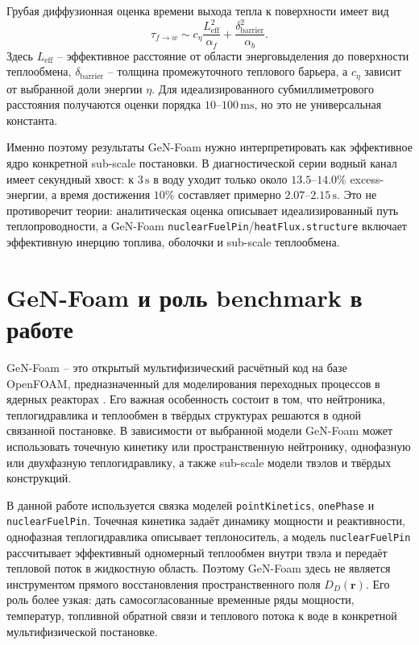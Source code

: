 \documentclass[12pt]{article}
\begin{document}
Грубая диффузионная оценка времени выхода тепла к поверхности имеет вид
\[
\tau_{f\to w}\sim
c_\eta\frac{L_{\mathrm{eff}}^2}{\alpha_f}
+
\frac{\delta_{\mathrm{barrier}}^2}{\alpha_b}.
\]
Здесь \(L_{\mathrm{eff}}\) -- эффективное расстояние от области энерговыделения до поверхности теплообмена, \(\delta_{\mathrm{barrier}}\) -- толщина промежуточного теплового барьера, а \(c_\eta\) зависит от выбранной доли энергии \(\eta\). Для идеализированного субмиллиметрового расстояния получаются оценки порядка \(10\)--\(100\,\mathrm{ms}\), но это не универсальная константа.

Именно поэтому результаты GeN-Foam нужно интерпретировать как эффективное ядро конкретной sub-scale постановки. В диагностической серии водный канал имеет секундный хвост: к \(3\,\mathrm{s}\) в воду уходит только около \(13.5\)--\(14.0\%\) excess-энергии, а время достижения \(10\%\) составляет примерно \(2.07\)--\(2.15\,\mathrm{s}\). Это не противоречит теории: аналитическая оценка описывает идеализированный путь теплопроводности, а GeN-Foam \texttt{nuclearFuelPin}/\texttt{heatFlux.structure} включает эффективную инерцию топлива, оболочки и sub-scale теплообмена.

\section{GeN-Foam и роль benchmark в работе}

GeN-Foam -- это открытый мультифизический расчётный код на базе OpenFOAM, предназначенный для моделирования переходных процессов в ядерных реакторах \cite{GeNFoam2015,foamForNuclear2026}. Его важная особенность состоит в том, что нейтроника, теплогидравлика и теплообмен в твёрдых структурах решаются в одной связанной постановке. В зависимости от выбранной модели GeN-Foam может использовать точечную кинетику или пространственную нейтронику, однофазную или двухфазную теплогидравлику, а также sub-scale модели твэлов и твёрдых конструкций.

В данной работе используется связка моделей \texttt{pointKinetics}, \texttt{onePhase} и \texttt{nuclearFuelPin}. Точечная кинетика задаёт динамику мощности и реактивности, однофазная теплогидравлика описывает теплоноситель, а модель \texttt{nuclearFuelPin} рассчитывает эффективный одномерный теплообмен внутри твэла и передаёт тепловой поток в жидкостную область. Поэтому GeN-Foam здесь не является инструментом прямого восстановления пространственного поля \(D_D(\mathbf r)\). Его роль более узкая: дать самосогласованные временные ряды мощности, температур, топливной обратной связи и теплового потока к воде в конкретной мультифизической постановке.
\end{document}
